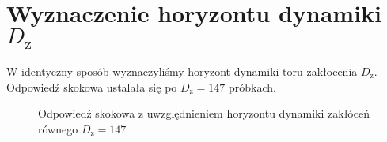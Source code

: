\section{Wyznaczenie horyzontu dynamiki $D_{\mathrm{z}}$}
\label{zad3_wyznacznie_Dz}
W identyczny sposób wyznaczyliśmy horyzont dynamiki toru zakłocenia $D_{\mathrm{z}}$. 
Odpowiedź skokowa ustalała się po $D_{\mathrm{z}} = \num{147}$ próbkach.

\begin{figure}[b]
    \centering
    \caption{Odpowiedź skokowa z uwzględnieniem horyzontu dynamiki zakłóceń równego $D_{\mathrm{z}} = 147$}
    \label{zad3_cut_resp_disturbance}
\end{figure}